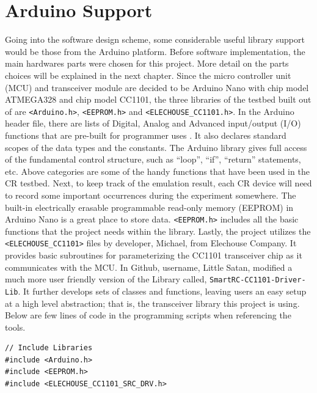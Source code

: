 \section{Arduino Support}
Going into the software design scheme, some considerable useful library support would be those from the Arduino platform. 
Before software implementation, the main hardwares parts were chosen for this project. More detail on the parts choices
will be explained in the next chapter. 
Since the micro controller unit (MCU) and transceiver module are decided to be Arduino Nano with chip model ATMEGA328 and 
chip model CC1101, the three libraries of the testbed built out of are \texttt{<Arduino.h>}, \texttt{<EEPROM.h>} and \texttt{<ELECHOUSE\_CC1101.h>}. 
In the Arduino header file, there are lists of Digital, Analog and Advanced input/output (I/O) functions that are pre-built
for programmer uses \cite{arduino_reference}. It also declares standard scopes of the data types and the constants.
The Arduino library gives full access of the fundamental control structure, such as ``loop'', ``if'', ``return'' statements,
etc. Above categories are some of the handy functions that have been used in the CR testbed. Next, to keep track of the 
emulation result, each CR device will need to record some important occurrences during the experiment somewhere.
The built-in electrically erasable programmable read-only memory (EEPROM) in Arduino Nano is a great place to store data. \texttt{<EEPROM.h>} includes all the basic
functions that the project needs within the library. Lastly, the project utilizes
the \texttt{<ELECHOUSE\_CC1101>} files by developer, Michael, from Elechouse Company. It provides basic subroutines
for parameterizing the CC1101 transceiver chip as it communicates with the MCU. 
In Github, username, Little Satan, modified a much more user friendly version of the Library called, 
\texttt{SmartRC-CC1101-Driver-Lib}. It further develops sets of classes and functions, leaving users an easy setup
at a high level abstraction; that is, the transceiver library this project is using. Below are few lines of code in 
the programming scripts when referencing the tools.
\newline
\begin{lstlisting}[caption={Library used in the testbed},captionpos=b]
// Include Libraries
#include <Arduino.h>
#include <EEPROM.h>
#include <ELECHOUSE_CC1101_SRC_DRV.h>
\end{lstlisting}


